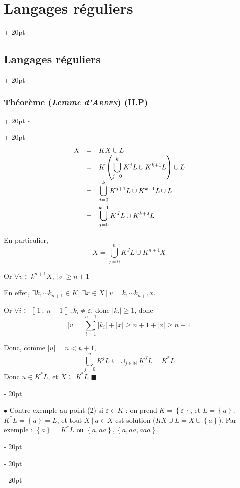 \documentclass[a4paper, 12pt, twoside]{article}
\newcommand{\N}{\mathbb{N}} %
\newcommand{\nset}[2]{\left\llbracket #1\ ;\ #2 \right\rrbracket}
\newcommand{\lr}[1]{\left( #1 \right)}
\newcommand{\set}[1]{\left\{ #1 \right\}}
\newcommand{\abs}[1]{\left\lvert #1 \right\rvert}
\renewcommand{\ge}{\geqslant}
\newcommand{\ind}[1][20pt]{\advance\leftskip + #1}
\newcommand{\deind}[1][20pt]{\advance\leftskip - #1}
\newenvironment{indt}[2][20pt]{#2 \par \ind[#1]}{\par \deind} %
\newenvironment{proof}[1][{}]{\begin{indt}{$\square$ #1}}{$\blacksquare$ \end{indt}}
\begin{document}
\begin{indt}{\section{Langages réguliers}}
\begin{indt}{\subsection{Langages réguliers}}
\begin{indt}{\subsubsection{Théorème (\textit{Lemme d'\textsc{Arden}}) (H.P)}}
\begin{proof}
                    \[
                        \begin{array}{rcl}
                            X
                            &=& KX \cup L
                            \\
                            &=& \displaystyle K\lr{\bigcup_{j = 0}^k K^j L \cup K^{k + 1}L} \cup L
                            \\
                            &=& \displaystyle \bigcup_{j = 0}^k K^{j + 1} L \cup K^{k + 1} L \cup L
                            \vspace{3pt}
                            \\
                            &=& \displaystyle \bigcup_{j = 0}^{k + 1} K^J L \cup K^{k + 2} L
                        \end{array}
                    \]

                    En particulier,
                    \[
                        X = \bigcup_{j = 0}^n K^J L \cup K^{n + 1} X
                    \]

                    Or $\forall v \in k^{n + 1}X,\ \abs v \ge n + 1$

                    En effet, $\exists k_1 \cdots k_{n + 1} \in K,\ \exists x \in X\ |\ v = k_1 \cdots k_{n + 1} x$.

                    Or $\forall i \in \nset 1 {n + 1}, k_i \neq \varepsilon$, donc $\abs{k_i} \ge 1$, donc
                    \[
                        \abs v = \sum_{i = 1}^{n + 1} \abs{k_i} + \abs x
                        \ge n + 1 + \abs x \ge n + 1
                    \]

                    Donc, comme $\abs u = n < n + 1$,
                    \[
                        \bigcup_{j = 0}^n K^j L \subseteq \cup_{j \in \N} K^J L = K^*L
                    \]
                    Donc $u \in K^* L$, et $X \subseteq K^*L$
                \end{proof}

                \vspace{12pt}
                
                $\bullet$ Contre-exemple au point (2) si $\varepsilon \in K$ : on prend $K = \set \varepsilon$, et $L = \set a$.
                $K^*L = \set a = L$, et tout $X\ |\ a \in X$ est solution ($KX\cup L = X \cup \set a$). Par exemple : $\set a = K^*L$ ou $\set{a, aa}, \set{a, aa, aaa}$.
            \end{indt}

            \vspace{12pt}
            

\end{indt}
\end{indt}
\end{document}
